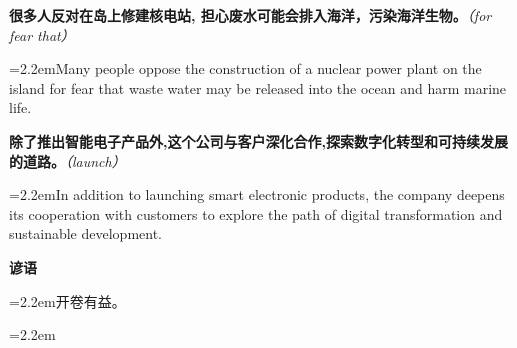 \documentclass[11pt,a4paper]{article}
\newcommand{\num}[1]{\makebox[1.9em][r]{#1.}\hspace{0.3em}}
\newcommand{\prompt}[1]{\emph{\textcolor{tipblue}{\small（#1）}}}
\begin{document}
\begin{minipage}{\linewidth}

\num{39}\textbf{很多人反对在岛上修建核电站, 担心废水可能会排入海洋，污染海洋生物。}\prompt{for fear that}

\vspace{0.15em}

\noindent\hangindent=2.2em\hspace{2.2em}Many people oppose the construction of a nuclear power plant on the island for fear that waste water may be released into the ocean and harm marine life.

\end{minipage}

\begin{minipage}{\linewidth}

\num{40}\textbf{除了推出智能电子产品外,这个公司与客户深化合作,探索数字化转型和可持续发展的道路。}\prompt{launch}

\vspace{0.15em}

\noindent\hangindent=2.2em\hspace{2.2em}In addition to launching smart electronic products, the company deepens its cooperation with customers to explore the path of digital transformation and sustainable development.

\end{minipage}

\num{41}\textbf{谚语}\quad 

\vspace{0.15em}

\noindent\hangindent=2.2em\hspace{2.2em}开卷有益。

\noindent\hangindent=2.2em
\end{document}

